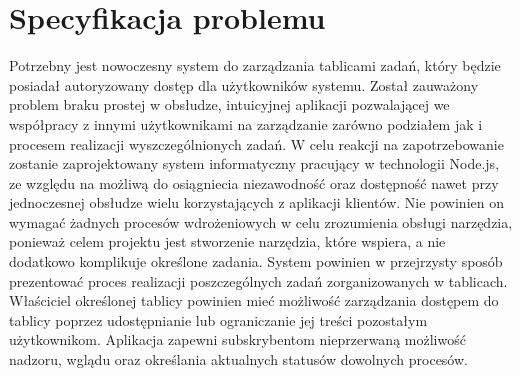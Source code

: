\documentclass[12pt]{report}
\begin{document}
\section{Specyfikacja problemu}
Potrzebny jest nowoczesny system do zarządzania tablicami zadań, który będzie posiadał autoryzowany dostęp dla użytkowników systemu. 
Został zauważony problem braku prostej w obsłudze, intuicyjnej aplikacji pozwalającej we współpracy z innymi użytkownikami na zarządzanie zarówno podziałem jak i procesem realizacji wyszczególnionych zadań.
W celu reakcji na zapotrzebowanie zostanie zaprojektowany system informatyczny pracujący w technologii Node.js, ze względu na możliwą do osiągniecia niezawodność oraz dostępność nawet przy jednoczesnej obsłudze wielu korzystających z aplikacji klientów.
Nie powinien on wymagać żadnych procesów wdrożeniowych w celu zrozumienia obsługi narzędzia, ponieważ celem projektu jest stworzenie narzędzia, które wspiera, a nie dodatkowo komplikuje określone zadania.
System powinien w przejrzysty sposób prezentować proces realizacji poszczególnych zadań zorganizowanych w tablicach.
Właściciel określonej tablicy powinien mieć możliwość zarządzania dostępem do tablicy poprzez udostępnianie lub ograniczanie jej treści pozostałym użytkownikom.
Aplikacja zapewni subskrybentom nieprzerwaną możliwość nadzoru, wglądu oraz określania aktualnych statusów dowolnych procesów.
\end{document}
